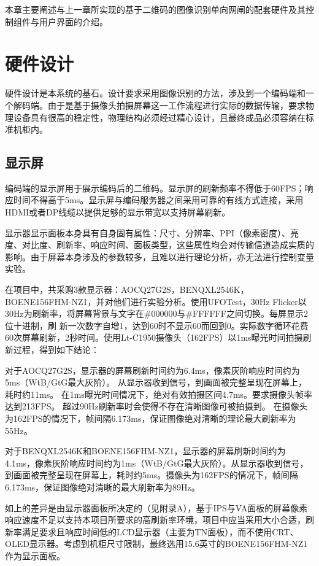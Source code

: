 \label{cha:hd}

本章主要阐述与上一章所实现的基于二维码的图像识别单向网闸的配套硬件及其控制组件与用户界面的介绍。

\section{硬件设计}

硬件设计是本系统的基石。设计要求采用图像识别的方法，涉及到一个编码端和一个解码端。由于是基于摄像头拍摄屏幕这一工作流程进行实际的数据传输，要求物理设备具有很高的稳定性，物理结构必须经过精心设计，且最终成品必须容纳在标准机柜内。

\subsection{显示屏}

编码端的显示屏用于展示编码后的二维码。显示屏的刷新频率不得低于60FPS；响应时间不得高于5ms。显示屏与编码服务器之间采用可靠的有线方式连接，采用HDMI或者DP线缆以提供足够的显示带宽以支持屏幕刷新。

显示器显示面板本身具有自身固有属性：尺寸、分辨率、PPI（像素密度）、亮度、对比度、刷新率、响应时间、面板类型，这些属性均会对传输信道造成实质的影响。由于屏幕本身涉及的参数较多，且难以进行理论分析，亦无法进行控制变量实验。

在项目中，共采购3款显示器：AOCQ27G2S，BENQXL2546K，BOENE156FHM-NZ1，并对他们进行实验分析。使用UFOTest，30Hz Flicker以30Hz为刷新率，将屏幕背景与⽂字在\#000000与\#FFFFFF之间切换。每屏显⽰2位⼗进制，刷 新⼀次数字⾃增1，达到60时不显⽰60⽽回到0。实际数字循环花费60次屏幕刷新，2秒时间。使用Lt-C1950摄像头（162FPS）以1ms曝光时间拍摄刷新过程，得到如下结论：

对于AOCQ27G2S，显⽰器的屏幕刷新时间约为6.4ms，像素灰阶响应时间约为5ms（WtB/GtG最⼤灰阶）。 从显⽰器收到信号，到画⾯被完整呈现在屏幕上，耗时约11ms。 在1ms曝光时间情况下，绝对有效拍摄区间4.7ms。要求摄像头帧率达到213FPS。 超过90Hz刷新率时会使得不存在清晰图像可被拍摄到。 在摄像头为162FPS的情况下，帧间隔6.173ms，保证图像绝对清晰的理论最⼤刷新率为55Hz。

对于BENQXL2546K和BOENE156FHM-NZ1，显⽰器的屏幕刷新时间约为4.1ms，像素灰阶响应时间约为1ms（WtB/GtG最⼤灰阶）。从显⽰器收到信号，到画⾯被完整呈现在屏幕上，耗时约5ms。摄像头为162FPS的情况下，帧间隔6.173ms，保证图像绝对清晰的最⼤刷新率为89Hz。

如上的差异是由显示器面板所决定的（见附录A），基于IPS与VA面板的屏幕像素响应速度不足以支持本项目所要求的高刷新率环境，项目中应当采用大小合适，刷新率满足要求且响应时间低的LCD显示器（主要为TN面板），而不使用CRT、OLED显示器。考虑到机柜尺寸限制，最终选用15.6英寸的BOENE156FHM-NZ1作为显示面板。

